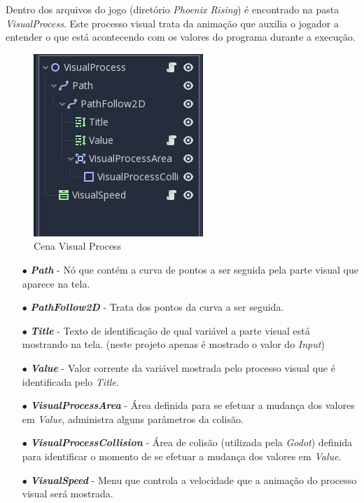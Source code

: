 Dentro dos arquivos do jogo (diretório \textit{Phoenix Rising}) é encontrado na
pasta \textit{VisualProcess}. Este processo visual trata da animação que auxilia
o jogador a entender o que está acontecendo com os valores do programa durante
a execução.

\begin{figure}[H]
    \includegraphics[scale=0.8]{../figuras/cena_visual_process.png}
    \caption{Cena Visual Process}
\end{figure}

\begin{itemize}
    \item[$\bullet$]
        \textbf{\textit{Path}} - Nó que contém a curva de pontos a ser seguida 
        pela parte visual que aparece na tela.
    \item[$\bullet$]
        \textbf{\textit{PathFollow2D}} - Trata dos pontos da curva a ser 
        seguida.
    \item[$\bullet$]
        \textbf{\textit{Title}} - Texto de identificação de qual variável a 
        parte visual está mostrando na tela. (neste projeto apenas é mostrado 
        o valor do \textit{Input})
    \item[$\bullet$]
        \textbf{\textit{Value}} - Valor corrente da variável mostrada pelo
        processo visual que é identificada pelo \textit{Title}.
    \item[$\bullet$]
        \textbf{\textit{VisualProcessArea}} - Área definida para se efetuar a
        mudança dos valores em \textit{Value}, administra alguns parâmetros da
        colisão.
    \item[$\bullet$]
        \textbf{\textit{VisualProcessCollision}} - Área de colisão (utilizada
        pela \textit{Godot}) definida para identificar o momento de se efetuar 
        a mudança dos valores em \textit{Value}.
    \item[$\bullet$]
        \textbf{\textit{VisualSpeed}} - Menu que controla a velocidade que a 
        animação do processo visual será mostrada. 
\end{itemize}

